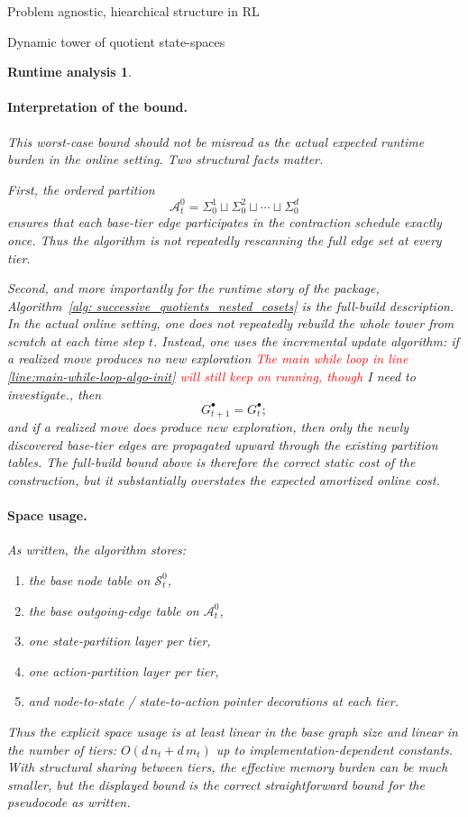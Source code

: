 \documentclass[11pt]{article}
\newtheorem{run_analysis}[subsubsection]{Runtime analysis}
\begin{document}
\begin{section}{Problem agnostic, hiearchical structure in RL}
\begin{subsection}{Dynamic tower of quotient state-spaces}
\begin{run_analysis}
\paragraph{Interpretation of the bound.}
This worst-case bound should not be misread as the actual expected runtime burden in the online setting. Two structural facts matter.

First, the ordered partition
\[
\mathcal{A}_t^0
=
\Sigma_0^1 \sqcup \Sigma_0^2 \sqcup \cdots \sqcup \Sigma_0^d
\]
ensures that each base-tier edge participates in the contraction schedule exactly once. Thus the algorithm is not repeatedly rescanning the full edge set at every tier.

Second, and more importantly for the runtime story of the package, Algorithm~\ref{alg: successive_quotients_nested_cosets} is the \emph{full-build} description. In the actual online setting, one does not repeatedly rebuild the whole tower from scratch at each time step $t$. Instead, one uses the incremental update algorithm: if a realized move produces no new exploration \textcolor{red}{The main while loop in line \ref{line:main-while-loop-algo-init} will still keep on running, though} {\color{blue} I need to investigate.}, then
\[
G_{t+1}^\bullet = G_t^\bullet;
\]
and if a realized move does produce new exploration, then only the newly discovered base-tier edges are propagated upward through the existing partition tables. The full-build bound above is therefore the correct static cost of the construction, but it substantially overstates the expected amortized online cost.

\paragraph{Space usage.}
As written, the algorithm stores:
\begin{enumerate}
    \item the base node table on $\mathcal{S}_t^0$,
    \item the base outgoing-edge table on $\mathcal{A}_t^0$,
    \item one state-partition layer per tier,
    \item one action-partition layer per tier,
    \item and node-to-state / state-to-action pointer decorations at each tier.
\end{enumerate}
Thus the explicit space usage is at least linear in the base graph size and linear in the number of tiers:
$
O(d\,n_t + d\,m_t)
$
up to implementation-dependent constants. With structural sharing between tiers, the effective memory burden can be much smaller, but the displayed bound is the correct straightforward bound for the pseudocode as written.


\end{run_analysis}
\end{subsection}
\end{section}
\end{document}
